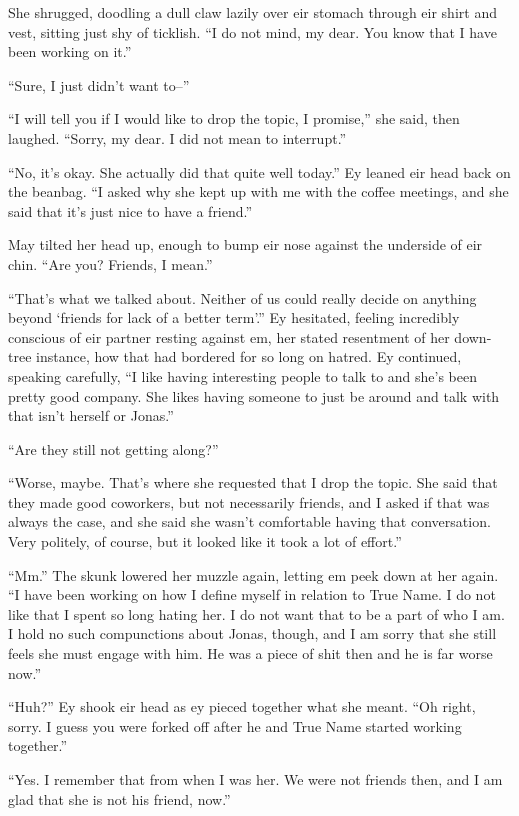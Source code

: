 She shrugged, doodling a dull claw lazily over eir stomach through eir shirt and vest, sitting just shy of ticklish. ``I do not mind, my dear. You know that I have been working on it.''

``Sure, I just didn't want to--''

``I will tell you if I would like to drop the topic, I promise,'' she said, then laughed. ``Sorry, my dear. I did not mean to interrupt.''

``No, it's okay. She actually did that quite well today.'' Ey leaned eir head back on the beanbag. ``I asked why she kept up with me with the coffee meetings, and she said that it's just nice to have a friend.''

May tilted her head up, enough to bump eir nose against the underside of eir chin. ``Are you? Friends, I mean.''

``That's what we talked about. Neither of us could really decide on anything beyond `friends for lack of a better term'.'' Ey hesitated, feeling incredibly conscious of eir partner resting against em, her stated resentment of her down-tree instance, how that had bordered for so long on hatred. Ey continued, speaking carefully, ``I like having interesting people to talk to and she's been pretty good company. She likes having someone to just be around and talk with that isn't herself or Jonas.''

``Are they still not getting along?''

``Worse, maybe. That's where she requested that I drop the topic. She said that they made good coworkers, but not necessarily friends, and I asked if that was always the case, and she said she wasn't comfortable having that conversation. Very politely, of course, but it looked like it took a lot of effort.''

``Mm.'' The skunk lowered her muzzle again, letting em peek down at her again. ``I have been working on how I define myself in relation to True Name. I do not like that I spent so long hating her. I do not want that to be a part of who I am. I hold no such compunctions about Jonas, though, and I am sorry that she still feels she must engage with him. He was a piece of shit then and he is far worse now.''

``Huh?'' Ey shook eir head as ey pieced together what she meant. ``Oh right, sorry. I guess you were forked off after he and True Name started working together.''

``Yes. I remember that from when I was her. We were not friends then, and I am glad that she is not his friend, now.''

